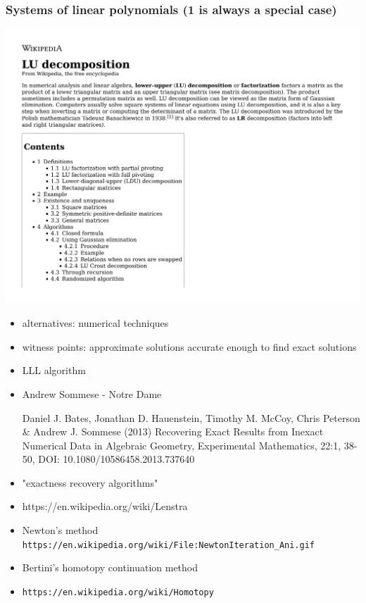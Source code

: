 \documentclass{beamer}
\begin{document}
\begin{frame}
\frametitle{Systems of linear polynomials (1 is always a special case)}

\includegraphics[width=\textwidth, page=13]{LU decomposition - Wikipedia.pdf}
\end{frame}

\begin{frame}
\begin{itemize}
\item alternatives: numerical techniques
\item witness points: approximate solutions accurate enough to find exact solutions
\item LLL algorithm

\item Andrew Sommese - Notre Dame

Daniel J. Bates, Jonathan D. Hauenstein, Timothy M. McCoy, Chris Peterson \& Andrew J. Sommese (2013)
Recovering Exact Results from Inexact Numerical Data in Algebraic Geometry,
Experimental Mathematics, 22:1, 38-50, DOI: 10.1080/10586458.2013.737640

\item "exactness recovery algorithms"
\item https://en.wikipedia.org/wiki/Lenstra%

\item Newton's method
     {\tt https://en.wikipedia.org/wiki/File:NewtonIteration\_Ani.gif}

\item Bertini's homotopy continuation method
\item {\tt https://en.wikipedia.org/wiki/Homotopy}
\end{itemize}
\end{frame}
\end{document}

